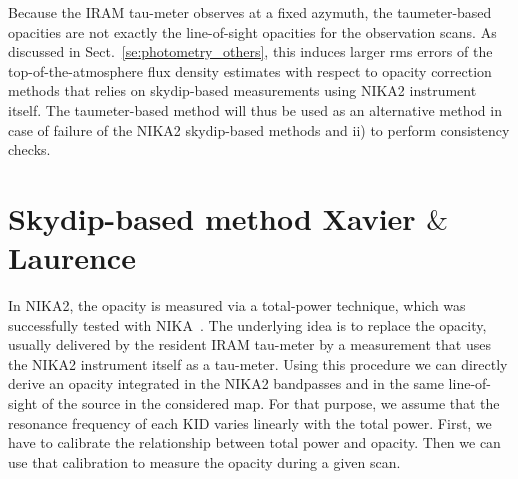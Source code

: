 %
%


Because the IRAM tau-meter observes at a fixed azymuth, the
taumeter-based opacities are not exactly the line-of-sight opacities for
the observation scans. As discussed in
Sect.~\ref{se:photometry_others}, this induces larger rms errors of
the top-of-the-atmosphere flux density estimates with respect to
opacity correction methods that relies on skydip-based measurements using
NIKA2 instrument itself. The taumeter-based method will thus be used
as an alternative method in case of failure of the NIKA2 skydip-based
methods and ii) to perform consistency checks.




\section{Skydip-based method {\color{YellowGreen} Xavier $\&$ Laurence}}
\label{se:skydip-method}

In NIKA2, the opacity is measured via a total-power technique, which was
successfully tested with NIKA~\cite{Catalano:2014nml}.  The
underlying idea is to replace the opacity, usually delivered by the resident
IRAM tau-meter by a measurement that uses the NIKA2 instrument itself
as a tau-meter. Using this procedure we can directly derive an opacity
integrated in the NIKA2 bandpasses and in the same line-of-sight of the
source in the considered map. For that purpose, we assume that the resonance
frequency of each KID varies linearly with the total power. First, we have to
calibrate the relationship between total power and opacity. Then we can use
that calibration to measure the opacity during a given scan.

